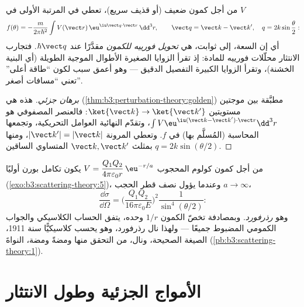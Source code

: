 \begin{theorem}\label{thm:b3:scattering-theory:born}
من أجل كمون ضعيف (أو قذيف سريع)، تعطي 
في المرتبة الأولى في $V$
\[
f(\theta) = -\frac{m}{2\pi\hbar^2}
\int V(\vect r)\,\eu^{\iu\vect q\cdot\vect r}\,\dd^3r ,
\qquad
\vect q = \vect k - \vect k' , \quad
q = 2k\sin\frac\theta2 :
\]
أي إن السعة، إلى ثوابت، هي \emph{تحويل فورييه للكمون}
مقدَّرًا عند  $\hbar\vect q$.
فتجارب الانتثار محلّلات فورييه للمادة: إذ تقرأ الزوايا
الصغيرة الأطوال الموجية الطويلة (أي البنية الخشنة)، وتقرأ الزوايا الكبيرة
التفصيل الدقيق --- وهو أعمق سبب لكون ``طاقة أعلى'' تعني
``مسافات أصغر''.
\end{theorem}

\begin{proof}[برهان جزئي]
هذه هي 
(\cref{thm:b3:perturbation-theory:golden}) مطبَّقة بين موجتين مستويتين
$\ket{\vect k} \to \ket{\vect k'}$: فالعنصر المصفوفي هو
$\int V\eu^{\iu(\vect k - \vect k')\cdot\vect r}\dd^3r$، وتقدّم
 النهائية العوامل التحريكية، وتجمعها
المحاسبة (المُسلَّم بها) في $f$. وتعطي المرونة
$|\vect k'| = |\vect k|$، ومنها $q = 2k\sin(\theta/2)$ بمثلث
$\vect k, \vect k'$ المتساوي الساقين.
\end{proof}

\begin{example}\label{ex:b3:scattering-theory:rutherford}
من أجل كمون كولوم المحجوب $V = \dfrac{Q_1Q_2}{4\pi
\varepsilon_0 r}\,\eu^{-r/a}$ يكون تكامل بورن أوليًا
(\cref{exo:b3:scattering-theory:5})، وعندما يؤول نصف قطر الحجب
$a \to \infty$،
\[
\frac{\dd\sigma}{\dd\Omega} =
\Big(\frac{Q_1Q_2}{16\pi\varepsilon_0 E}\Big)^2
\frac{1}{\sin^4(\theta/2)} :
\]
وهو \emph{ رذرفورد}. وبمصادفة تخصّ
الكمون $1/r$ وحده، يتفق الحساب الكلاسيكي 
والجواب الكمومي المضبوط جميعًا --- ولهذا نال رذرفورد،
وهو يحسب كلاسيكيًّا سنة 1911، الصيغة الصحيحة، ونال، من
التحقق منها ومضةً ومضة، النواةَ
(\cref{pb:b3:scattering-theory:1}).
\end{example}

\section{الأمواج الجزئية وطول الانتثار}

